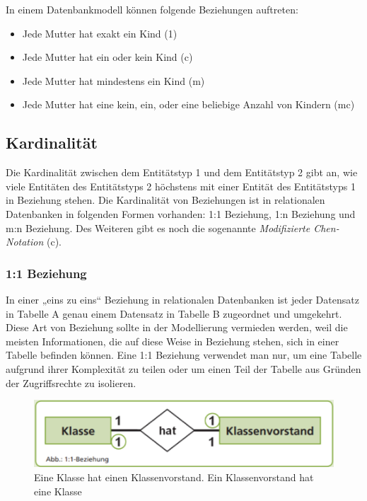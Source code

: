  In einem Datenbankmodell können folgende Beziehungen auftreten:

 \begin{itemize}
     \item Jede Mutter hat exakt ein Kind (1)
     \item Jede Mutter hat ein oder kein Kind (c)
     \item Jede Mutter hat mindestens ein Kind (m)
     \item Jede Mutter hat eine kein, ein, oder eine beliebige Anzahl von Kindern (mc)
 \end{itemize}

 \subsection{Kardinalität}

 Die Kardinalität zwischen dem Entitätstyp 1 und dem Entitätstyp 2 gibt an, wie viele Entitäten des Entitätstyps 2 höchstens mit einer Entität des Entitätstyps 1 in Beziehung stehen. Die Kardinalität von Beziehungen ist in relationalen Datenbanken in folgenden Formen vorhanden: 
 1:1 Beziehung, 1:n Beziehung und m:n Beziehung. Des Weiteren gibt es noch die sogenannte \emph{Modifizierte Chen-Notation} (c).
 
 \subsubsection{1:1 Beziehung}

 In einer „eins zu eins“ Beziehung in relationalen Datenbanken ist jeder Datensatz in Tabelle A genau einem Datensatz in Tabelle B zugeordnet und umgekehrt. Diese Art von Beziehung sollte in der Modellierung vermieden werden, weil die meisten Informationen, die auf diese Weise in Beziehung stehen, sich in einer Tabelle befinden können. Eine 1:1 Beziehung verwendet man nur, um eine Tabelle aufgrund ihrer Komplexität zu teilen oder um einen Teil der Tabelle aus Gründen der Zugriffsrechte zu isolieren.

 \begin{figure}[H]
    \centering
    \includegraphics[width=.8\textwidth]{Content/images/modellierung/11.png}
    \caption{Eine Klasse hat einen Klassenvorstand. Ein Klassenvorstand hat eine Klasse}
    \label{fig:modellierung:11}
 \end{figure}

